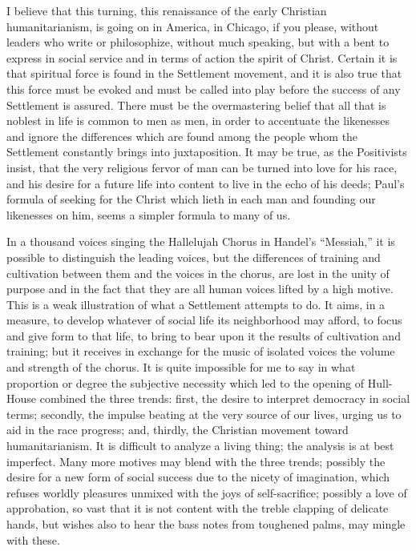 I believe that this turning, this renaissance of the early Christian
humanitarianism, is going on in America, in Chicago, if you please,
without leaders who write or philosophize, without much speaking, but
with a bent to express in social service and in terms of action the
spirit of Christ. Certain it is that spiritual force is found in the
Settlement movement, and it is also true that this force must be
evoked and must be called into play before the success of any
Settlement is assured. There must be the overmastering belief that all
that is noblest in life is common to men as men, in order to
accentuate the likenesses and ignore the differences which are found
among the people whom the Settlement constantly brings into
juxtaposition. It may be true, as the Positivists insist, that the
very religious fervor of man can be turned into love for his race, and
his desire for a future life into content to live in the echo of his
deeds; Paul's formula of seeking for the Christ which lieth in each
man and founding our likenesses on him, seems a simpler formula to
many of us.

In a thousand voices singing the Hallelujah Chorus in Handel's
``Messiah,'' it is possible to distinguish  the leading
voices, but the differences of training and cultivation between them
and the voices in the chorus, are lost in the unity of purpose and in
the fact that they are all human voices lifted by a high motive. This
is a weak illustration of what a Settlement attempts to do. It aims,
in a measure, to develop whatever of social life its neighborhood may
afford, to focus and give form to that life, to bring to bear upon it
the results of cultivation and training; but it receives in exchange
for the music of isolated voices the volume and strength of the
chorus. It is quite impossible for me to say in what proportion or
degree the subjective necessity which led to the opening of Hull-House
combined the three trends: first, the desire to interpret democracy in
social terms; secondly, the impulse beating at the very source of our
lives, urging us to aid in the race progress; and, thirdly, the
Christian movement toward humanitarianism. It is difficult to analyze
a living thing; the analysis is at best imperfect. Many more motives
may blend with the three trends; possibly the desire for a new form of
social success due to the nicety of imagination, which refuses worldly
pleasures unmixed with the joys of self-sacrifice; possibly a love of
approbation, so vast that it is not content with the treble clapping
of delicate hands, but wishes also to hear the bass notes from
toughened palms, may mingle with these.


